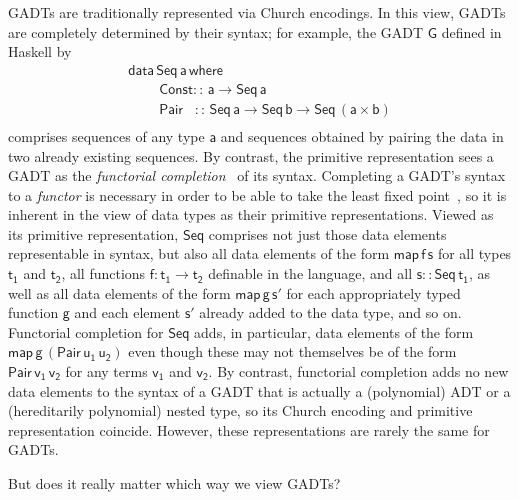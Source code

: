 \documentclass[acmsmall,screen,review,anonymous]{acmart}
\theoremstyle{definition}
\begin{document}
GADTs are traditionally represented via Church encodings. In this
view, GADTs are completely determined by their syntax; for example,
the GADT $\mathsf{G}$ defined in Haskell by
\begin{equation}\label{eq:seq}
\begin{array}{l}
\mathsf{data\, Seq\,a\,where}\\
\mathsf{\;\;\;\;\;\;\;\;Const ::\, a \to Seq\,a}\\
\mathsf{\;\;\;\;\;\;\;\;Pair\,\,\,\,\, ::\, Seq \,a \to Seq\,b \to
  Seq\,(a \times b)}\\ 
\end{array}
\end{equation}
\noindent
comprises sequences of any type $\mathsf{a}$ and sequences obtained by
pairing the data in two already existing sequences. By contrast, the
primitive representation sees a GADT as the {\em functorial
  completion}~\cite{jp19} of its syntax. Completing a GADT's syntax to
a {\em functor} is necessary in order to be able to take the least
fixed point~\cite{tfca}, so it is inherent in the view of data types
as their primitive representations. Viewed as its primitive
representation, $\mathsf{Seq}$ comprises not just those data elements
representable in syntax, but also all data elements of the form
$\mathsf{map\,f\,s}$ for all types $\mathsf{t_1}$ and $\mathsf{t_2}$,
all functions $\mathsf{f : t_1 \to t_2}$ definable in the language,
and all $\mathsf{s :: Seq\,t_1}$, as well as all data elements of the
form $\mathsf{map\,g\,s'}$ for each appropriately typed function
$\mathsf{g}$ and each element $\mathsf{s'}$ already added to the data
type, and so on. Functorial completion for $\mathsf{Seq}$ adds, in
particular, data elements of the form
$\mathsf{map\,g\,(Pair\,u_1\,u_2)}$ even though these may not
themselves be of the form $\mathsf{Pair\,v_1\,v_2}$ for any terms
$\mathsf{v_1}$ and $\mathsf{v_2}$. By contrast, functorial completion
adds no new data elements to the syntax of a GADT that is actually a
(polynomial) ADT or a (hereditarily polynomial) nested type, so its
Church encoding and primitive representation coincide. However, these
representations are rarely the same for GADTs.

But does it really matter which way we view GADTs?
\end{document}
